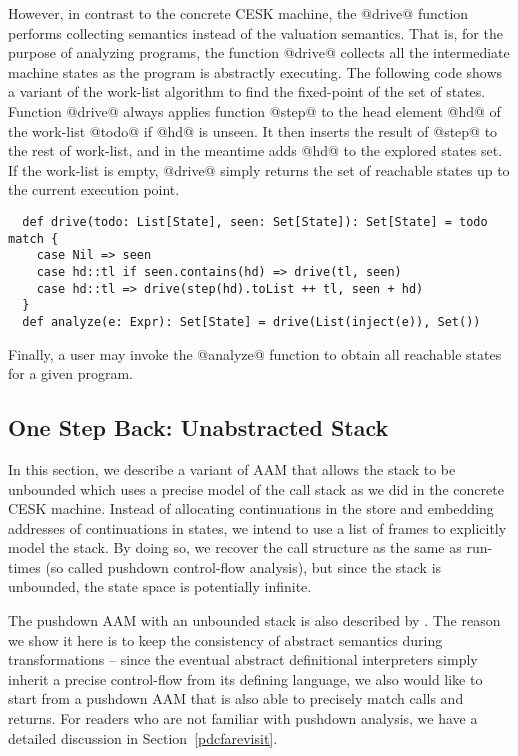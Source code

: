 \documentclass[acmsmall, review]{acmart}\settopmatter{}
\begin{document}
However, in contrast to the concrete CESK machine, the @drive@ function performs 
collecting semantics instead of the valuation semantics. That is, for the purpose of
analyzing programs, the function @drive@ collects all the intermediate machine states 
as the program is abstractly executing. The following code shows a variant of the 
work-list algorithm to find the fixed-point of the set of states.
Function @drive@ always applies function @step@ to the head element @hd@ of
the work-list @todo@ if @hd@ is unseen. It then inserts the result of @step@ to
the rest of work-list, and in the meantime adds @hd@ to the explored states set.
If the work-list is empty, @drive@ simply returns the set of reachable states
up to the current execution point.

\begin{lstlisting}
  def drive(todo: List[State], seen: Set[State]): Set[State] = todo match {
    case Nil => seen
    case hd::tl if seen.contains(hd) => drive(tl, seen)
    case hd::tl => drive(step(hd).toList ++ tl, seen + hd)
  }
  def analyze(e: Expr): Set[State] = drive(List(inject(e)), Set())
\end{lstlisting}

Finally, a user may invoke the @analyze@ function to obtain all reachable states for 
a given program.


\subsection{One Step Back: Unabstracted Stack} \label{unabs}

In this section, we describe a variant of AAM that allows the stack to be unbounded 
which uses a precise model of the call stack as we did in the concrete CESK machine.
Instead of allocating continuations in the store and embedding addresses of 
continuations in states, we intend to use a list of frames to explicitly model 
the stack. By doing so, we recover the call structure as the same as run-times
(so called pushdown control-flow analysis), but since the stack is unbounded, 
the state space is potentially infinite. 

The pushdown AAM with an unbounded stack is also described by \citeauthor{van2012systematic} 
\cite{van2012systematic}. 
The reason we show it here is to keep the consistency of abstract semantics during 
transformations -- since the eventual abstract definitional interpreters simply inherit
a precise control-flow from its defining language, we also would like to start from a
pushdown AAM that is also able to precisely match calls and returns.
For readers who are not familiar with pushdown analysis, we have a detailed discussion 
in Section~\ref{pdcfarevisit}.
\end{document}
